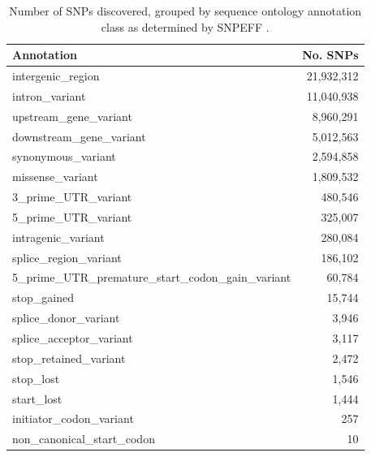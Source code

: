 \documentclass[a4paper,11pt,abstracton,hidelinks]{scrartcl}
\begin{document}
\begin{table}[h]
\begin{center}
\begin{threeparttable}

\caption{Number of SNPs discovered, grouped by sequence ontology annotation class as determined by SNPEFF \citep{Cingolani2012}.}

\label{table:snpeff}

\begin{tabular}{lr}
 \hline
 \textbf{Annotation} & \textbf{No. SNPs} \\
 \hline
intergenic\_region & 21,932,312 \\
intron\_variant & 11,040,938 \\
upstream\_gene\_variant & 8,960,291 \\
downstream\_gene\_variant & 5,012,563 \\
synonymous\_variant & 2,594,858 \\
missense\_variant & 1,809,532 \\
3\_prime\_UTR\_variant & 480,546 \\
5\_prime\_UTR\_variant & 325,007 \\
intragenic\_variant & 280,084 \\
splice\_region\_variant & 186,102 \\
5\_prime\_UTR\_premature\_start\_codon\_gain\_variant & 60,784 \\
stop\_gained & 15,744 \\
splice\_donor\_variant & 3,946 \\
splice\_acceptor\_variant & 3,117 \\
stop\_retained\_variant & 2,472 \\
stop\_lost & 1,546 \\
start\_lost & 1,444 \\
initiator\_codon\_variant & 257 \\
non\_canonical\_start\_codon & 10 \\
 \hline
\end{tabular}

\end{threeparttable}
\end{center}
\end{table}
\end{document}
